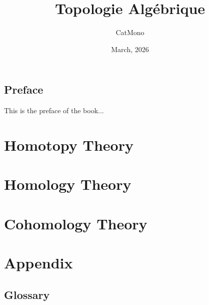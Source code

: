 \documentclass[11pt]{../../TexTemplate/elegantbook} %
\title{Topologie Algébrique} %
\author{CatMono} %
\date{March, 2026} %
\begin{document}
\maketitle %

\frontmatter        %
\tableofcontents    %

\chapter{Preface}   %
This is the preface of the book...

\mainmatter         %
\part{Homotopy Theory}
\part{Homology Theory}
\part{Cohomology Theory}



\appendix
\part{Appendix} %
\chapter{Glossary} %
\end{document}
